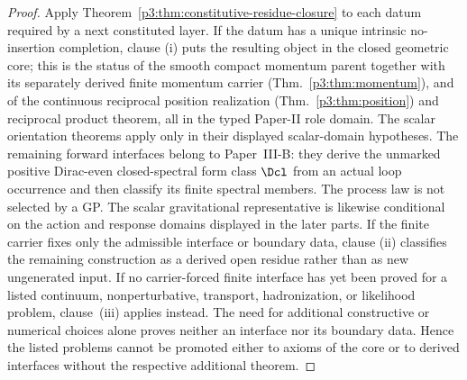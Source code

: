 \documentclass[11pt,a4paper]{article}
\begin{document}
\begin{proof}
Apply Theorem~\ref{p3:thm:constitutive-residue-closure} to each datum
required by a next constituted layer.  If the datum has a unique intrinsic
no-insertion completion, clause (i) puts the resulting object in the closed
geometric core; this is the status of the smooth compact momentum parent together with its separately derived finite momentum carrier
(Thm.~\ref{p3:thm:momentum}), and of the continuous reciprocal position
realization (Thm.~\ref{p3:thm:position}) and reciprocal product theorem, all in the
typed Paper-II role domain.  The scalar orientation theorems apply only in
their displayed scalar-domain hypotheses.  The remaining forward interfaces
belong to Paper~III-B: they derive the unmarked positive Dirac-even
closed-spectral form class \(\Dcl\) from an actual loop occurrence and then
classify its finite spectral members.  The process law is not selected by a
GP.  The scalar gravitational representative is likewise conditional on the
action and response domains displayed in the later parts.  If the finite
carrier fixes only the admissible interface or boundary data, clause (ii)
classifies the remaining construction as a derived open residue rather than as
new ungenerated input.  If no carrier-forced finite interface has yet been
proved for a listed continuum, nonperturbative, transport, hadronization, or
likelihood problem, clause~(iii) applies instead.  The need for additional
constructive or numerical choices alone proves neither an interface nor its
boundary data.  Hence the listed problems cannot be promoted either to axioms
of the core or to derived interfaces without the respective additional
theorem.
\end{proof}
\end{document}
